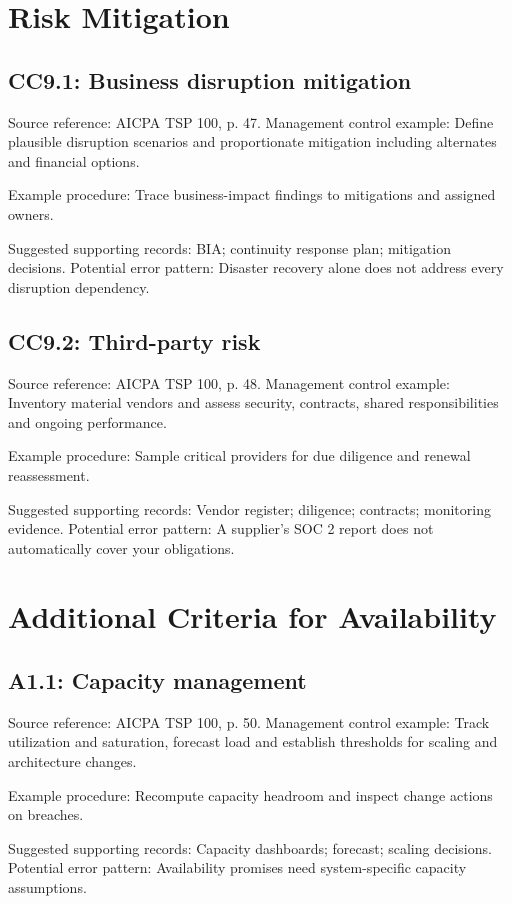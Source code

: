 \documentclass[10pt,oneside]{report}
\begin{document}
\section{Risk Mitigation}
\subsection*{CC9.1: Business disruption mitigation}
Source reference: AICPA TSP 100, p. 47. Management control example: Define plausible disruption scenarios and proportionate mitigation including alternates and financial options.

Example procedure: Trace business-impact findings to mitigations and assigned owners.

Suggested supporting records: BIA; continuity response plan; mitigation decisions. Potential error pattern: Disaster recovery alone does not address every disruption dependency.

\subsection*{CC9.2: Third-party risk}
Source reference: AICPA TSP 100, p. 48. Management control example: Inventory material vendors and assess security, contracts, shared responsibilities and ongoing performance.

Example procedure: Sample critical providers for due diligence and renewal reassessment.

Suggested supporting records: Vendor register; diligence; contracts; monitoring evidence. Potential error pattern: A supplier's SOC 2 report does not automatically cover your obligations.

\section{Additional Criteria for Availability}
\subsection*{A1.1: Capacity management}
Source reference: AICPA TSP 100, p. 50. Management control example: Track utilization and saturation, forecast load and establish thresholds for scaling and architecture changes.

Example procedure: Recompute capacity headroom and inspect change actions on breaches.

Suggested supporting records: Capacity dashboards; forecast; scaling decisions. Potential error pattern: Availability promises need system-specific capacity assumptions.
\end{document}
